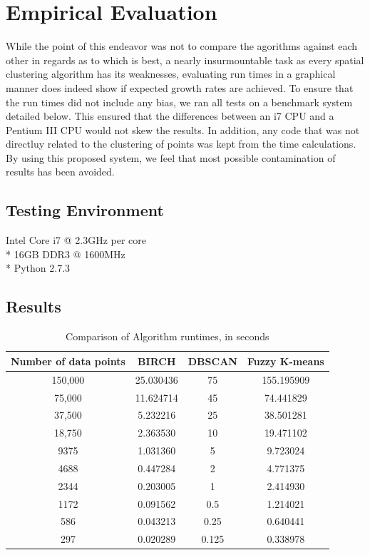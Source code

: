 \documentclass[conference, 10pt]{IEEEtran}
\begin{document}
\section{Empirical Evaluation}
While the point of this endeavor was not to compare the agorithms against each other in regards as to which is best, a nearly insurmountable task as every spatial clustering algorithm has its weaknesses, evaluating run times in a graphical manner does indeed show if expected growth rates are achieved. To ensure that the run times did not include any bias, we ran all tests on a benchmark system detailed below. This ensured that the differences between an i7 CPU and a Pentium III CPU would not skew the results. In addition, any code that was not directluy related to the clustering of points was kept from the time calculations. By using this proposed system, we feel that most possible contamination of results has been avoided.

\subsection{Testing Environment}
\begin{center}
Intel Core i7 @ 2.3GHz per core\\*
16GB DDR3 @ 1600MHz\\*
Python 2.7.3
\end{center}

\subsection{Results}

\begin{table}[h]
\begin{center}
\caption{Comparison of Algorithm runtimes, in seconds} \label{Table1Label}
\begin{tabular}{|c|c|c|c|}
 \hline
 Number of data points & BIRCH & DBSCAN& Fuzzy K-means \\
 \hline
 150,000 & 25.030436 & 75 & 155.195909\\
 \hline
 75,000 & 11.624714 & 45 & 74.441829\\
 \hline
 37,500 & 5.232216 & 25 & 38.501281\\
 \hline
 18,750 & 2.363530 & 10 & 19.471102\\
 \hline
 9375 & 1.031360 & 5 & 9.723024\\
 \hline
 4688 & 0.447284 & 2 & 4.771375\\
 \hline
 2344 & 0.203005 & 1 & 2.414930\\
 \hline
 1172 & 0.091562 & 0.5 & 1.214021\\
 \hline
 586 & 0.043213 & 0.25 & 0.640441\\
 \hline
 297 & 0.020289 & 0.125 & 0.338978\\
 \hline
\end{tabular}
\end{center}
\end{table}
\end{document}
